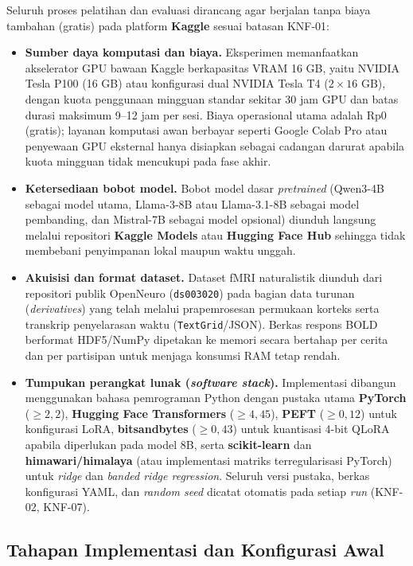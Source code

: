 Seluruh proses pelatihan dan evaluasi dirancang agar berjalan tanpa biaya tambahan (gratis) pada platform \textbf{Kaggle} sesuai batasan KNF-01:
\begin{itemize}
  \item \textbf{Sumber daya komputasi dan biaya.} Eksperimen memanfaatkan akselerator GPU bawaan Kaggle berkapasitas VRAM 16 GB, yaitu NVIDIA Tesla P100 (16 GB) atau konfigurasi dual NVIDIA Tesla T4 ($2 \times 16\text{ GB}$), dengan kuota penggunaan mingguan standar sekitar 30 jam GPU dan batas durasi maksimum 9--12 jam per sesi. Biaya operasional utama adalah Rp0 (gratis); layanan komputasi awan berbayar seperti Google Colab Pro atau penyewaan GPU eksternal hanya disiapkan sebagai cadangan darurat apabila kuota mingguan tidak mencukupi pada fase akhir.
  \item \textbf{Ketersediaan bobot model.} Bobot model dasar \textit{pretrained} (Qwen3-4B sebagai model utama, Llama-3-8B atau Llama-3.1-8B sebagai model pembanding, dan Mistral-7B sebagai model opsional) diunduh langsung melalui repositori \textbf{Kaggle Models} atau \textbf{Hugging Face Hub} sehingga tidak membebani penyimpanan lokal maupun waktu unggah.
  \item \textbf{Akuisisi dan format dataset.} Dataset fMRI naturalistik \textcite{lebel2023natural} diunduh dari repositori publik OpenNeuro (\texttt{ds003020}) pada bagian data turunan (\textit{derivatives}) yang telah melalui prapemrosesan permukaan korteks serta transkrip penyelarasan waktu (\texttt{TextGrid}/JSON). Berkas respons BOLD berformat HDF5/NumPy dipetakan ke memori secara bertahap per cerita dan per partisipan untuk menjaga konsumsi RAM tetap rendah.
  \item \textbf{Tumpukan perangkat lunak (\textit{software stack}).} Implementasi dibangun menggunakan bahasa pemrograman Python dengan pustaka utama \textbf{PyTorch} ($\ge 2{,}2$), \textbf{Hugging Face Transformers} ($\ge 4{,}45$), \textbf{PEFT} ($\ge 0{,}12$) untuk konfigurasi LoRA, \textbf{bitsandbytes} ($\ge 0{,}43$) untuk kuantisasi 4-bit QLoRA apabila diperlukan pada model 8B, serta \textbf{scikit-learn} dan \textbf{himawari/himalaya} (atau implementasi matriks terregularisasi PyTorch) untuk \textit{ridge} dan \textit{banded ridge regression}. Seluruh versi pustaka, berkas konfigurasi YAML, dan \textit{random seed} dicatat otomatis pada setiap \textit{run} (KNF-02, KNF-07).
\end{itemize}

\subsection{Tahapan Implementasi dan Konfigurasi Awal}
\label{sub:rs_tahapan}

